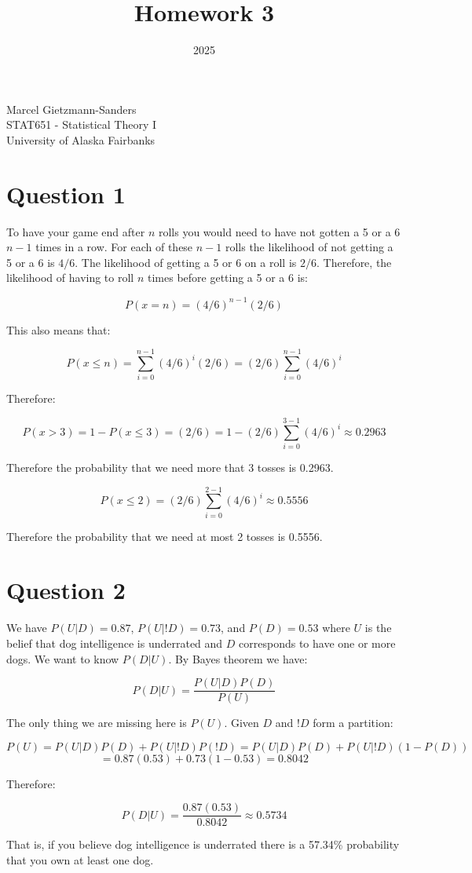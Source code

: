 \documentclass[11pt]{article}
\title{Homework 3}
\date{2025}
\makeatletter
\renewcommand{\maketitle}{
\begin{center}

\pagestyle{empty}

{\Large \bf \@title\par}
\vspace{1cm}

{\LARGE Marcel Gietzmann-Sanders}\\[1cm]

STAT651 - Statistical Theory I \\
University of Alaska Fairbanks


\end{center}
}\makeatother
\makeatother
\begin{document}
\maketitle

\section{Question 1}

To have your game end after $n$ rolls you would need to have not gotten a 5 or a 6 $n-1$ times in a row. For each of these $n-1$ rolls the likelihood of not getting a 5 or a 6 is $4/6$. The likelihood of getting a 5 or 6 on a roll is $2/6$. Therefore, the likelihood of having to roll $n$ times before getting a 5 or a 6 is:

$$P(x=n)=(4/6)^{n-1}(2/6)$$

This also means that:

$$P(x\leq n) = \sum_{i=0}^{n-1}(4/6)^{i}(2/6)=(2/6)\sum_{i=0}^{n-1}(4/6)^{i}$$

Therefore:

$$P(x>3)=1-P(x\leq 3)=(2/6)=1-(2/6)\sum_{i=0}^{3-1}(4/6)^{i}\approx 0.2963$$

Therefore the probability that we need more that 3 tosses is 0.2963. 

$$P(x\leq 2)=(2/6)\sum_{i=0}^{2-1}(4/6)^{i}\approx 0.5556$$

Therefore the probability that we need at most 2 tosses is 0.5556. 

\section{Question 2}

We have $P(U|D)=0.87$, $P(U|!D)=0.73$, and $P(D)=0.53$ where $U$ is the belief that dog intelligence is underrated and $D$ corresponds to have one or more dogs. We want to know $P(D|U)$. By Bayes theorem we have:

$$P(D|U)=\frac{P(U|D)P(D)}{P(U)}$$

The only thing we are missing here is $P(U)$. Given $D$ and $!D$ form a partition:

$$P(U)=P(U|D)P(D) + P(U|!D)P(!D)=P(U|D)P(D) + P(U|!D)(1-P(D))$$
$$=0.87(0.53)+0.73(1-0.53)=0.8042$$

Therefore:

$$P(D|U)=\frac{0.87(0.53)}{0.8042}\approx 0.5734$$

That is, if you believe dog intelligence is underrated there is a 57.34\% probability that you own at least one dog.
\end{document}
